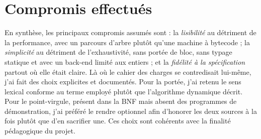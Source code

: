 \section{Compromis effectués}

En synthèse, les principaux compromis assumés sont : la \emph{lisibilité} au
détriment de la performance, avec un parcours d'arbre plutôt qu'une machine à
bytecode ; la \emph{simplicité} au détriment de l'exhaustivité, sans portée de
bloc, sans typage statique et avec un back-end limité aux entiers ; et la
\emph{fidélité à la spécification} partout où elle était claire. Là où le cahier
des charges se contredisait lui-même, j'ai fait des choix explicites et
documentés. Pour la portée, j'ai retenu le sens lexical conforme au terme employé
plutôt que l'algorithme dynamique décrit. Pour le point-virgule, présent dans la
BNF mais absent des programmes de démonstration, j'ai préféré le rendre optionnel
afin d'honorer les deux sources à la fois plutôt que d'en sacrifier une. Ces choix
sont cohérents avec la finalité pédagogique du projet.
